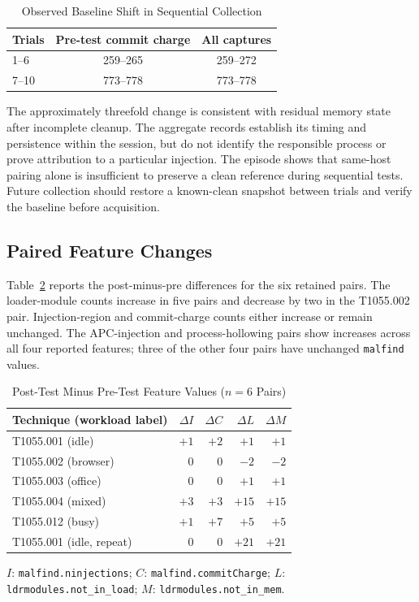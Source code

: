 \documentclass[conference]{IEEEtran}
\begin{document}
\begin{table}[t]
\caption{Observed Baseline Shift in Sequential Collection}
\label{tab:contamination}
\centering
\small
\begin{tabular}{@{}lcc@{}}
\toprule
Trials & Pre-test commit charge & All captures \\
\midrule
1--6 & 259--265 & 259--272 \\
7--10 & 773--778 & 773--778 \\
\bottomrule
\end{tabular}
\end{table}

The approximately threefold change is consistent with residual memory state
after incomplete cleanup. The aggregate records establish its timing and
persistence within the session, but do not identify the responsible process
or prove attribution to a particular injection. The episode shows that
same-host pairing alone is insufficient to preserve a clean reference during
sequential tests. Future collection should restore a known-clean snapshot
between trials and verify the baseline before acquisition.

\subsection{Paired Feature Changes}
Table~\ref{tab:deltas} reports the post-minus-pre differences for the six
retained pairs. The loader-module counts increase in five pairs and decrease
by two in the T1055.002 pair. Injection-region and commit-charge counts either
increase or remain unchanged. The APC-injection and process-hollowing pairs
show increases across all four reported features; three of the other four
pairs have unchanged \texttt{malfind} values.

\begin{table}[t]
\caption{Post-Test Minus Pre-Test Feature Values ($n=6$ Pairs)}
\label{tab:deltas}
\centering
\small
\setlength{\tabcolsep}{3pt}
\begin{tabular}{@{}lrrrr@{}}
\toprule
Technique (workload label) & $\Delta I$ & $\Delta C$ & $\Delta L$ & $\Delta M$ \\
\midrule
T1055.001 (idle) & $+1$ & $+2$ & $+1$ & $+1$ \\
T1055.002 (browser) & $0$ & $0$ & $-2$ & $-2$ \\
T1055.003 (office) & $0$ & $0$ & $+1$ & $+1$ \\
T1055.004 (mixed) & $+3$ & $+3$ & $+15$ & $+15$ \\
T1055.012 (busy) & $+1$ & $+7$ & $+5$ & $+5$ \\
T1055.001 (idle, repeat) & $0$ & $0$ & $+21$ & $+21$ \\
\bottomrule
\end{tabular}
\par\smallskip
\begin{minipage}{\columnwidth}\footnotesize\raggedright
$I$: \texttt{malfind.ninjections}; $C$: \texttt{malfind.commitCharge};
$L$: \texttt{ldrmodules.not\_in\_load};
$M$: \texttt{ldrmodules.not\_in\_mem}.
\end{minipage}
\end{table}
\end{document}
